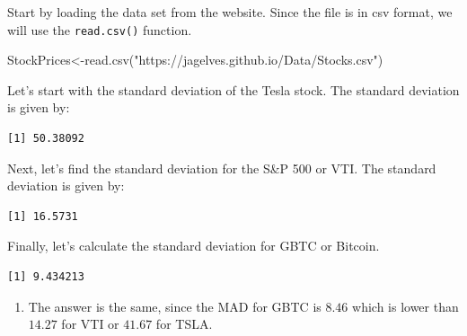 \documentclass[
  letterpaper,
  DIV=11,
  numbers=noendperiod]{scrreprt}
\newenvironment{Shaded}{\begin{snugshade}}{\end{snugshade}}
\newcommand{\FunctionTok}[1]{\textcolor[rgb]{0.28,0.35,0.67}{#1}}
\newcommand{\NormalTok}[1]{\textcolor[rgb]{0.00,0.23,0.31}{#1}}
\newcommand{\OtherTok}[1]{\textcolor[rgb]{0.00,0.23,0.31}{#1}}
\newcommand{\SpecialCharTok}[1]{\textcolor[rgb]{0.37,0.37,0.37}{#1}}
\newcommand{\StringTok}[1]{\textcolor[rgb]{0.13,0.47,0.30}{#1}}
\providecommand{\tightlist}{%
  \setlength{\itemsep}{0pt}\setlength{\parskip}{0pt}}\usepackage{longtable,booktabs,array}
\begin{document}
Start by loading the data set from the website. Since the file is in csv
format, we will use the \texttt{read.csv()} function.

\begin{Shaded}
\begin{Highlighting}[numbers=left,,]
\NormalTok{StockPrices}\OtherTok{\textless{}{-}}\FunctionTok{read.csv}\NormalTok{(}\StringTok{"https://jagelves.github.io/Data/Stocks.csv"}\NormalTok{)}
\end{Highlighting}
\end{Shaded}

Let's start with the standard deviation of the Tesla stock. The standard
deviation is given by:

\begin{Shaded}
\end{Shaded}

\begin{verbatim}
[1] 50.38092
\end{verbatim}

Next, let's find the standard deviation for the S\&P 500 or VTI. The
standard deviation is given by:

\begin{Shaded}
\end{Shaded}

\begin{verbatim}
[1] 16.5731
\end{verbatim}

Finally, let's calculate the standard deviation for GBTC or Bitcoin.

\begin{Shaded}
\end{Shaded}

\begin{verbatim}
[1] 9.434213
\end{verbatim}

\begin{blackbox}

\begin{enumerate}
\def\labelenumi{\arabic{enumi}.}
\setcounter{enumi}{1}
\tightlist
\item
  The answer is the same, since the MAD for GBTC is \(8.46\) which is
  lower than \(14.27\) for VTI or \(41.67\) for TSLA.
\end{enumerate}

\end{blackbox}
\end{document}
